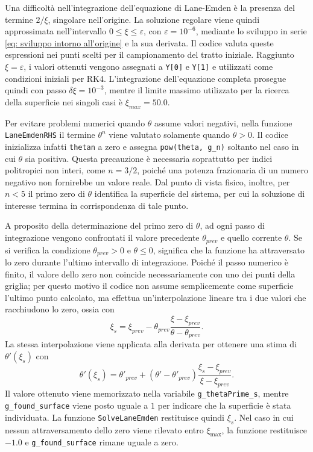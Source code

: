 \documentclass{article}
\numberwithin{equation}{section}
\begin{document}
Una difficoltà nell'integrazione dell'equazione di Lane-Emden è la presenza del termine $2/\xi$, singolare nell'origine. La soluzione regolare viene quindi approssimata nell'intervallo $0 \leq \xi \leq \varepsilon$, con $\varepsilon = 10^{-6}$, mediante lo sviluppo in serie \eqref{eq: sviluppo intorno all'origine} e la sua derivata. Il codice valuta queste espressioni nei punti scelti per il campionamento del tratto iniziale. Raggiunto $\xi = \varepsilon$, i valori ottenuti vengono assegnati a \texttt{Y[0]} e \texttt{Y[1]} e utilizzati come condizioni iniziali per RK4. L'integrazione dell'equazione completa prosegue quindi con passo $\delta\xi = 10^{-3}$, mentre il limite massimo utilizzato per la ricerca della superficie nei singoli casi è $\xi_{max} = 50.0$.

Per evitare problemi numerici quando $\theta$ assume valori negativi, nella funzione \texttt{LaneEmdenRHS} il termine $\theta^n$ viene valutato solamente quando $\theta>0$. Il codice inizializza infatti \texttt{thetan} a zero e assegna
\texttt{pow(theta, g\_n)} soltanto nel caso in cui $\theta$ sia positiva. Questa precauzione è necessaria soprattutto per indici politropici non interi, come $n=3/2$, poiché una potenza frazionaria di un numero negativo non fornirebbe un valore reale. Dal punto di vista fisico, inoltre, per $n<5$ il primo zero di $\theta$ identifica la superficie del sistema, per cui la soluzione di interesse termina in corrispondenza di tale punto. 

A proposito della determinazione del primo zero di $\theta$, ad ogni passo di integrazione vengono confrontati il valore precedente $\theta_{prev}$ e quello corrente $\theta$. Se si verifica la condizione $\theta_{prev}>0$ e $\theta\leq0$, significa che la funzione ha attraversato lo zero durante l'ultimo intervallo di integrazione. Poiché il passo numerico è finito, il valore dello zero non coincide necessariamente con uno dei punti della griglia; per questo motivo il codice non assume semplicemente come superficie l'ultimo punto calcolato, ma effettua un'interpolazione lineare tra i due valori che racchiudono lo zero, ossia con
\begin{equation}
    \xi_s = \xi_{prev}-\theta_{prev}\frac{\xi-\xi_{prev}}{\theta-\theta_{prev}}.
\end{equation}
La stessa interpolazione viene applicata alla derivata per ottenere una stima di $\theta'(\xi_s)$ con
\begin{equation}
    \theta'(\xi_s) = \theta'_{prev} + \left(\theta'-\theta'_{prev}\right)\frac{\xi_s-\xi_{prev}}{\xi-\xi_{prev}}.
\end{equation}
Il valore ottenuto viene memorizzato nella variabile \texttt{g\_thetaPrime\_s}, mentre \texttt{g\_found\_surface} viene posto uguale a $1$ per indicare che la superficie è stata individuata. La funzione \texttt{SolveLaneEmden} restituisce quindi $\xi_s$. Nel caso in cui nessun attraversamento dello zero viene rilevato entro $\xi_{\max}$, la funzione restituisce $-1.0$ e \texttt{g\_found\_surface} rimane uguale a zero.
\end{document}
